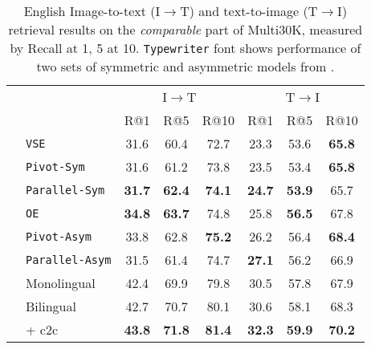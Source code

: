 \begin{table*}[t]
\centering
\renewcommand{\arraystretch}{1.3}
\begin{tabular}{llcccccc}
\toprule
& & \multicolumn{3}{c}{I$\rightarrow$T}  & \multicolumn{3}{c}{T$\rightarrow$I}   \\
 						& & R@1 & R@5 & R@10 & R@1 & R@5 & R@10 \\
\cmidrule{3-8}
\parbox[t]{2mm}{} & {\tt VSE}				& 31.6 & 60.4 & 72.7 & 23.3 & 53.6 & \bf{65.8}\\
& {\tt Pivot-Sym}		    & 31.6 & 61.2 & 73.8  & 23.5 & 53.4 & \bf{65.8}\\
& {\tt Parallel-Sym}      & \bf{31.7} & \bf{62.4} & \bf{74.1}  & \bf{24.7} & \bf{53.9} & 65.7 \\
\midrule
\parbox[t]{2mm}{} & {\tt OE}				& \bf{34.8} & \bf{63.7} & 74.8 & 25.8 & \bf{56.5} & 67.8\\
& {\tt Pivot-Asym}    	& 33.8 & 62.8 & \bf{75.2}  & 26.2 & 56.4 & \bf{68.4}\\
& {\tt Parallel-Asym}     & 31.5 & 61.4 & 74.7  & \bf{27.1} & 56.2 & 66.9\\
\midrule
& Monolingual	  			& 42.4 & 69.9 & 79.8 & 30.5 & 57.8 & 67.9  \\
& Bilingual 	  			& 42.7 & 70.7 & 80.1 & 30.6 & 58.1 & 68.3  \\
& + c2c     	  			& \bf{43.8} & \bf{71.8} & \bf{81.4} & \bf{32.3} &  \bf{59.9} & \bf{70.2} \\
\bottomrule
\end{tabular}
\caption{English Image-to-text (I$\rightarrow$T) and text-to-image (T$\rightarrow$I) retrieval results on the \emph{comparable} part of Multi30K, measured by Recall at 1, 5 at 10. {\tt Typewriter} font shows performance of two sets of symmetric and asymmetric models from \cite{gella2017image}.}
\label{tab:bi:bilingualEng}
\end{table*}

